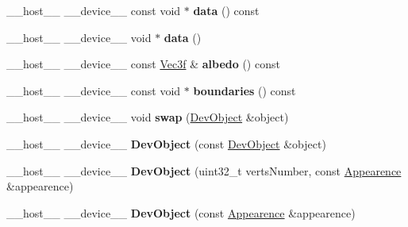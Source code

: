 \begin{DoxyCompactItemize}
\item 
\+\_\+\+\_\+host\+\_\+\+\_\+ \+\_\+\+\_\+device\+\_\+\+\_\+ const void $\ast$ {\bfseries data} () const\hypertarget{class_dev_object_a5533321471ee0ee776e30594ed48379f}{}\label{class_dev_object_a5533321471ee0ee776e30594ed48379f}

\item 
\+\_\+\+\_\+host\+\_\+\+\_\+ \+\_\+\+\_\+device\+\_\+\+\_\+ void $\ast$ {\bfseries data} ()\hypertarget{class_dev_object_a5335f7fb1dd5d15622aff5a8e9b0dc12}{}\label{class_dev_object_a5335f7fb1dd5d15622aff5a8e9b0dc12}

\item 
\+\_\+\+\_\+host\+\_\+\+\_\+ \+\_\+\+\_\+device\+\_\+\+\_\+ const \hyperlink{class_vec3}{Vec3f} \& {\bfseries albedo} () const\hypertarget{class_dev_object_ac4d2c0fc90a7be3085697e914bacc4d8}{}\label{class_dev_object_ac4d2c0fc90a7be3085697e914bacc4d8}

\item 
\+\_\+\+\_\+host\+\_\+\+\_\+ \+\_\+\+\_\+device\+\_\+\+\_\+ const void $\ast$ {\bfseries boundaries} () const\hypertarget{class_dev_object_a588ddd69ed74bc886b89fd4864024732}{}\label{class_dev_object_a588ddd69ed74bc886b89fd4864024732}

\item 
\+\_\+\+\_\+host\+\_\+\+\_\+ \+\_\+\+\_\+device\+\_\+\+\_\+ void {\bfseries swap} (\hyperlink{class_dev_object}{Dev\+Object} \&object)\hypertarget{class_dev_object_a56cf3cfc311cfe04da3b45f80e36625e}{}\label{class_dev_object_a56cf3cfc311cfe04da3b45f80e36625e}

\item 
\+\_\+\+\_\+host\+\_\+\+\_\+ \+\_\+\+\_\+device\+\_\+\+\_\+ {\bfseries Dev\+Object} (const \hyperlink{class_dev_object}{Dev\+Object} \&object)\hypertarget{class_dev_object_a0eb5ac616858ccb98c7f9d0d6b136e37}{}\label{class_dev_object_a0eb5ac616858ccb98c7f9d0d6b136e37}

\item 
\+\_\+\+\_\+host\+\_\+\+\_\+ \+\_\+\+\_\+device\+\_\+\+\_\+ {\bfseries Dev\+Object} (uint32\+\_\+t verts\+Number, const \hyperlink{struct_appearence}{Appearence} \&appearence)\hypertarget{class_dev_object_a8a2f767cf3ef43bd298777d0c832a020}{}\label{class_dev_object_a8a2f767cf3ef43bd298777d0c832a020}

\item 
\+\_\+\+\_\+host\+\_\+\+\_\+ \+\_\+\+\_\+device\+\_\+\+\_\+ {\bfseries Dev\+Object} (const \hyperlink{struct_appearence}{Appearence} \&appearence)\hypertarget{class_dev_object_ac209dfe2089d0bc1b581d8437d9957a9}{}\label{class_dev_object_ac209dfe2089d0bc1b581d8437d9957a9}


\end{DoxyCompactItemize}
